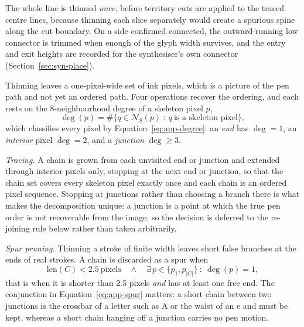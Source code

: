 The whole line is thinned \emph{once}, before territory cuts are applied to the traced centre lines, because thinning each slice separately would create a spurious spine along the cut boundary. On a side confirmed connected, the outward-running low connector is trimmed when enough of the glyph width survives, and the entry and exit heights are recorded for the synthesiser's own connector (Section~\ref{sec:syn-place}).


Thinning leaves a one-pixel-wide set of ink pixels, which is a picture of the pen path and not yet an ordered path.
Four operations recover the ordering, and each rests on the 8-neighbourhood degree of a skeleton pixel $p$,
\begin{equation}
\deg(p)=\#\bigl\{q\in\mathcal N_8(p)\ :\ q\ \text{is a skeleton pixel}\bigr\},
\label{eq:app-degree}
\end{equation}
which classifies every pixel by Equation~\ref{eq:app-degree}: an \emph{end} has $\deg=1$, an \emph{interior} pixel $\deg=2$, and a \emph{junction} $\deg\ge3$.

\emph{Tracing.}
A chain is grown from each unvisited end or junction and extended through interior pixels only, stopping at the next end or junction, so that the chain set covers every skeleton pixel exactly once and each chain is an ordered pixel sequence.
Stopping at junctions rather than choosing a branch there is what makes the decomposition unique: a junction is a point at which the true pen order is not recoverable from the image, so the decision is deferred to the re-joining rule below rather than taken arbitrarily.

\emph{Spur pruning.}
Thinning a stroke of finite width leaves short false branches at the ends of real strokes.
A chain is discarded as a spur when
\begin{equation}
\mathrm{len}(C)<2.5\ \text{pixels}\quad\wedge\quad \exists\,p\in\{p_1,p_{|C|}\}\ :\ \deg(p)=1,
\label{eq:app-spur}
\end{equation}
that is when it is shorter than 2.5 pixels \emph{and} has at least one free end.
The conjunction in Equation~\ref{eq:app-spur} matters: a short chain between two junctions is the crossbar of a letter such as A or the waist of an e and must be kept, whereas a short chain hanging off a junction carries no pen motion.

